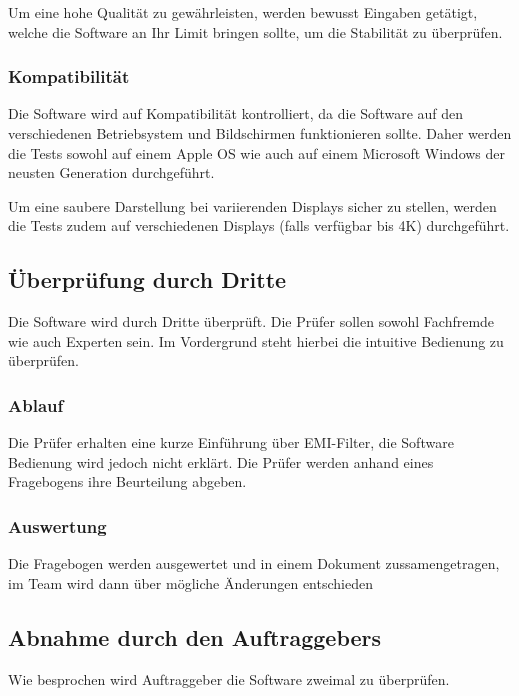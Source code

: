 Um eine hohe Qualität zu gewährleisten, werden bewusst Eingaben getätigt, welche die Software an Ihr Limit bringen sollte, um die Stabilität zu überprüfen. 

\subsubsection{Kompatibilität} \label{subsubsec:2}
 
Die Software wird auf Kompatibilität kontrolliert, da die Software auf den verschiedenen Betriebsystem und Bildschirmen funktionieren sollte. Daher werden die Tests sowohl auf  einem Apple OS wie auch auf einem Microsoft Windows der neusten Generation durchgeführt.

Um eine saubere Darstellung bei variierenden Displays sicher zu stellen, werden die Tests zudem auf verschiedenen Displays (falls verfügbar bis 4K) durchgeführt.

\subsection{Überprüfung durch Dritte} \label{subsec:4}

Die Software wird durch Dritte überprüft. Die Prüfer sollen sowohl Fachfremde wie auch Experten sein. Im Vordergrund steht hierbei die intuitive Bedienung zu überprüfen.

\subsubsection{Ablauf} \label{subsubsec:1}

Die Prüfer erhalten eine kurze Einführung über EMI-Filter, die Software Bedienung wird jedoch nicht erklärt. Die Prüfer werden anhand eines Fragebogens ihre Beurteilung abgeben.

\subsubsection{Auswertung} \label{subsubsec:2}

Die  Fragebogen  werden ausgewertet und  in einem Dokument zussamengetragen, im Team wird dann über mögliche Änderungen entschieden 

\subsection{Abnahme durch den Auftraggebers} \label{subsec:4}

Wie besprochen wird Auftraggeber die Software zweimal zu überprüfen.

